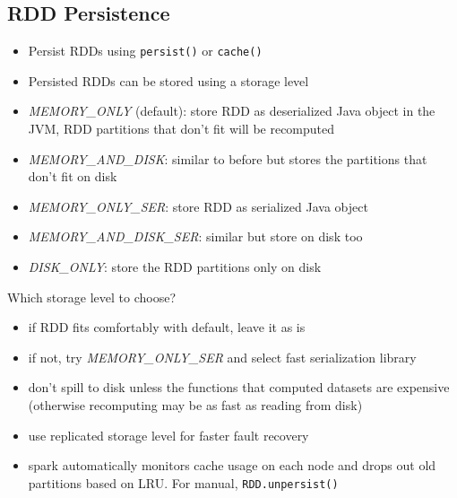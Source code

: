 \subsection{RDD Persistence}
\begin{frame}
\begin{itemize}
  \item Persist RDDs using \texttt{persist()} or \texttt{cache()}
  \item Persisted RDDs can be stored using a storage level
  \item \textit{MEMORY\_ONLY} (default): store RDD as deserialized Java object
  in the JVM, RDD partitions that don't fit will be recomputed
  \item \textit{MEMORY\_AND\_DISK}: similar to before but stores the partitions
  that don't fit on disk
  \item \textit{MEMORY\_ONLY\_SER}: store RDD as serialized Java object
  \item \textit{MEMORY\_AND\_DISK\_SER}: similar but store on disk too
  \item \textit{DISK\_ONLY}: store the RDD partitions only on disk
\end{itemize}
\end{frame}

\begin{frame}
Which storage level to choose?
\begin{itemize}
  \item if RDD fits comfortably with default, leave it as is
  \item if not, try \textit{MEMORY\_ONLY\_SER} and select fast serialization
  library
  \item don't spill to disk unless the functions that computed datasets are
  expensive (otherwise recomputing may be as fast as reading from disk)
  \item use replicated storage level for faster fault recovery
  \item spark automatically monitors cache usage on each node and drops out old
  partitions based on LRU. For manual, \texttt{RDD.unpersist()}
\end{itemize}
\end{frame}

